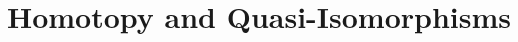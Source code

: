 \documentclass[../../main]{subfiles}
\begin{document}
\section{Homotopy and Quasi-Isomorphisms}
\end{document}
